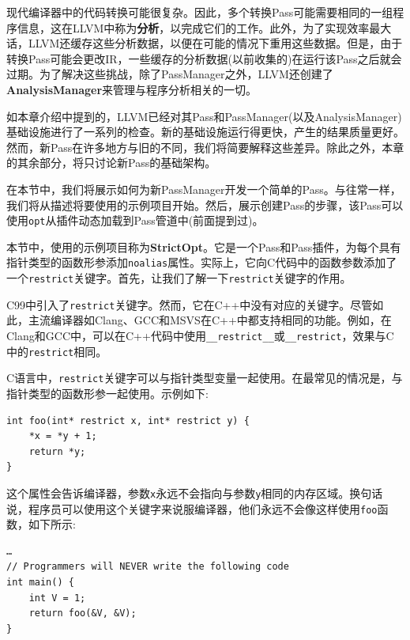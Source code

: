 现代编译器中的代码转换可能很复杂。因此，多个转换Pass可能需要相同的一组程序信息，这在LLVM中称为\textbf{分析}，以完成它们的工作。此外，为了实现效率最大话，LLVM还缓存这些分析数据，以便在可能的情况下重用这些数据。但是，由于转换Pass可能会更改IR，一些缓存的分析数据(以前收集的)在运行该Pass之后就会过期。为了解决这些挑战，除了PassManager之外，LLVM还创建了\textbf{AnalysisManager}来管理与程序分析相关的一切。

如本章介绍中提到的，LLVM已经对其Pass和PassManager(以及AnalysisManager)基础设施进行了一系列的检查。新的基础设施运行得更快，产生的结果质量更好。然而，新Pass在许多地方与旧的不同，我们将简要解释这些差异。除此之外，本章的其余部分，将只讨论新Pass的基础架构。

在本节中，我们将展示如何为新PassManager开发一个简单的Pass。与往常一样，我们将从描述将要使用的示例项目开始。然后，展示创建Pass的步骤，该Pass可以使用\texttt{opt}从插件动态加载到Pass管道中(前面提到过)。


本节中，使用的示例项目称为\textbf{StrictOpt}。它是一个Pass和Pass插件，为每个具有指针类型的函数形参添加\texttt{noalias}属性。实际上，它向C代码中的函数参数添加了一个\texttt{restrict}关键字。首先，让我们了解一下\texttt{restrict}关键字的作用。

\begin{tcolorbox}[colback=blue!5!white,colframe=blue!75!black, fonttitle=\bfseries,title=C和C++中的restrict关键字]	
\hspace*{0.7cm}C99中引入了\texttt{restrict}关键字。然而，它在C++中没有对应的关键字。尽管如此，主流编译器如Clang、GCC和MSVS在C++中都支持相同的功能。例如，在Clang和GCC中，可以在C++代码中使用\texttt{\_\_restrict\_\_}或\texttt{\_\_restrict}，效果与C中的\texttt{restrict}相同。
\end{tcolorbox}

C语言中，\texttt{restrict}关键字可以与指针类型变量一起使用。在最常见的情况是，与指针类型的函数形参一起使用。示例如下:

\begin{lstlisting}[style=styleCXX]
int foo(int* restrict x, int* restrict y) {
	*x = *y + 1;
	return *y;
}
\end{lstlisting}

这个属性会告诉编译器，参数\texttt{x}永远不会指向与参数\texttt{y}相同的内存区域。换句话说，程序员可以使用这个关键字来说服编译器，他们永远不会像这样使用\texttt{foo}函数，如下所示:

\begin{lstlisting}[style=styleCXX]
…
// Programmers will NEVER write the following code
int main() {
	int V = 1;
	return foo(&V, &V);
}
\end{lstlisting}

